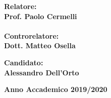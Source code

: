 \begin{titlepage}
\vspace{10mm}
\par
\noindent
\begin{minipage}[t]{0.47\textwidth}
{\large{\bf Relatore:\\
Prof. Paolo Cermelli}}\\
\vspace{2mm}
{\large{\bf \\ Controrelatore:\\
Dott. Matteo Osella}}
\end{minipage}
\hfill
\begin{minipage}[t]{0.47\textwidth}\raggedleft
\vspace{8mm}
{\large{\bf Candidato:\\
Alessandro Dell'Orto}}
\end{minipage}
\vspace{8mm}
\begin{center}
{\large{\bf 
Anno Accademico 2019/2020}}
\end{center}

\end{titlepage}
